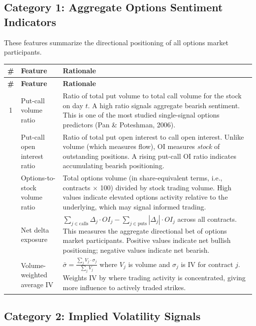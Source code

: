 \documentclass[11pt,a4paper]{article}
\begin{document}
\subsection{Category 1: Aggregate Options Sentiment Indicators}

These features summarize the directional positioning of all options market participants.

\begin{longtable}{@{}cp{3cm}p{8cm}@{}}
\toprule
\textbf{\#} & \textbf{Feature} & \textbf{Rationale} \\
\midrule
\endfirsthead
\toprule
\textbf{\#} & \textbf{Feature} & \textbf{Rationale} \\
\midrule
\endhead
1 & Put-call volume ratio & Ratio of total put volume to total call volume for the stock on day $t$. A high ratio signals aggregate bearish sentiment. This is one of the most studied single-signal options predictors (Pan \& Poteshman, 2006). \\
\addlinespace
2 & Put-call open interest ratio & Ratio of total put open interest to call open interest. Unlike volume (which measures flow), OI measures \emph{stock} of outstanding positions. A rising put-call OI ratio indicates accumulating bearish positioning. \\
\addlinespace
3 & Options-to-stock volume ratio & Total options volume (in share-equivalent terms, i.e., contracts $\times$ 100) divided by stock trading volume. High values indicate elevated options activity relative to the underlying, which may signal informed trading. \\
\addlinespace
4 & Net delta exposure & $\sum_{j \in \text{calls}} \Delta_j \cdot OI_j - \sum_{j \in \text{puts}} |\Delta_j| \cdot OI_j$ across all contracts. This measures the aggregate directional bet of options market participants. Positive values indicate net bullish positioning; negative values indicate net bearish. \\
\addlinespace
5 & Volume-weighted average IV & $\bar{\sigma} = \frac{\sum_j V_j \cdot \sigma_j}{\sum_j V_j}$ where $V_j$ is volume and $\sigma_j$ is IV for contract $j$. Weights IV by where trading activity is concentrated, giving more influence to actively traded strikes. \\
\bottomrule
\end{longtable}

\subsection{Category 2: Implied Volatility Signals}
\end{document}

